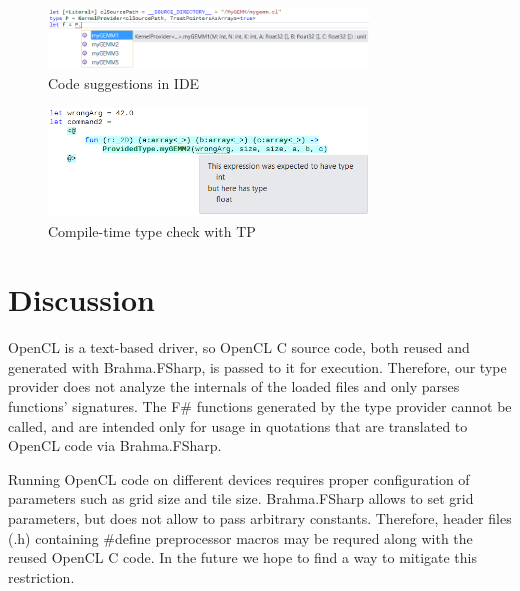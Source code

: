 \documentclass[sigplan,review]{acmart}\settopmatter{printfolios=true}
\begin{document}
\begin{figure}[h]
\centering
\includegraphics[width=8.5cm]{graphics/example-multiple-suggestions.png}
\caption{Code suggestions in IDE}
\label{pic:suggestions}
\end{figure}

\begin{figure}[h]
\centering
\includegraphics[width=8.5cm]{graphics/example-compile-error.png}
\caption{Compile-time type check with TP}
\label{pic:error}
\end{figure}

\section{Discussion}

OpenCL is a text-based driver, so OpenCL C source code, both reused and generated with Brahma.FSharp, is passed to it for execution. Therefore, our type provider does not analyze the internals of the loaded files and only parses functions' signatures. The F\# functions generated by the type provider cannot be called, and are intended only for usage in quotations that are translated to OpenCL code via Brahma.FSharp.

Running OpenCL code on different devices requires proper configuration of parameters such as grid size and tile size. Brahma.FSharp allows to set grid parameters, but does not allow to pass arbitrary constants. Therefore, header files (.h) containing \#define preprocessor macros may be requred along with the reused OpenCL C code. In the future we hope to find a way to mitigate this restriction.






\end{document}
